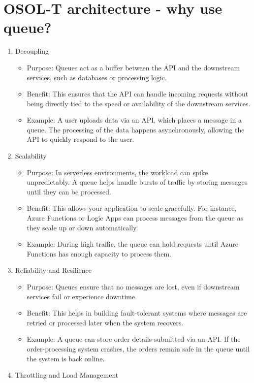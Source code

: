 \documentclass[a4paper,11pt]{article}
\begin{document}
\section{OSOL-T architecture - why use queue?}
\begin{enumerate}
	\item Decoupling
	\begin{itemize}
		\item Purpose: Queues act as a buffer between the API and the downstream services, such as databases or processing logic.
		\item Benefit: This ensures that the API can handle incoming requests without being directly tied to the speed or availability of the downstream services.
		\item Example: A user uploads data via an API, which places a message in a queue. The processing of the data happens asynchronously, allowing the API to quickly respond to the user.
	\end{itemize}
	\item Scalability
	\begin{itemize}
		\item Purpose: In serverless environments, the workload can spike unpredictably. A queue helps handle bursts of traffic by storing messages until they can be processed.
		\item Benefit: This allows your application to scale gracefully. For instance, Azure Functions or Logic Apps can process messages from the queue as they scale up or down automatically.
		\item Example: During high traffic, the queue can hold requests until Azure Functions has enough capacity to process them.
	\end{itemize}
	\item Reliability and Resilience
	\begin{itemize}
		\item Purpose: Queues ensure that no messages are lost, even if downstream services fail or experience downtime.
		\item Benefit: This helps in building fault-tolerant systems where messages are retried or processed later when the system recovers.
		\item Example: A queue can store order details submitted via an API. If the order-processing system crashes, the orders remain safe in the queue until the system is back online.
	\end{itemize}
	\item Throttling and Load Management

\end{enumerate}
\end{document}
